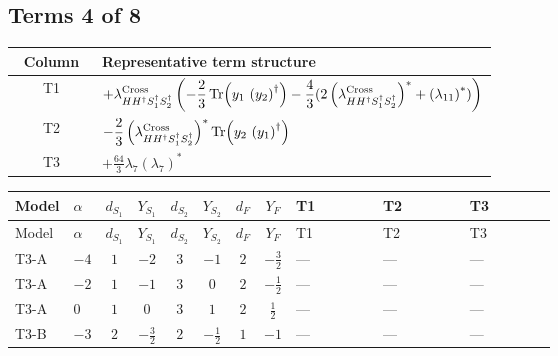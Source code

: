 \documentclass[8pt]{article}
\begin{document}
\begin{landscape}
\subsection*{Terms 4 of 8}
\begin{center}
\begin{tabular}{@{}c >{\raggedright\arraybackslash}p{0.82\linewidth}@{}}
\toprule
Column & Representative term structure \\
\midrule
T1 & \(\displaystyle +{\lambda_{H H^\dagger S_1^\dagger S_2^\dagger}^{\rm Cross}} \left(-\frac{2}{3} \operatorname{Tr}\!\left({y_1}\,\left({y_2}\right)^{\dagger}\right)-\frac{4}{3} (2 \left({\lambda_{H H^\dagger S_1^\dagger S_2^\dagger}^{\rm Cross}}\right)^{*}+\left({\lambda_{11}}\right)^{*})\right)\) \\
\midrule
T2 & \(\displaystyle -\frac{2}{3} \left({\lambda_{H H^\dagger S_1^\dagger S_2^\dagger}^{\rm Cross}}\right)^{*} \operatorname{Tr}\!\left({y_2}\,\left({y_1}\right)^{\dagger}\right)\) \\
\midrule
T3 & \(\displaystyle +\frac{64}{3} {\lambda_{7}} \left({\lambda_{7}}\right)^{*}\) \\
\midrule
\bottomrule
\end{tabular}
\end{center}
\smallskip
\tiny
\begin{longtable}{@{}llcccccc >{\raggedright\arraybackslash}p{0.21\linewidth} >{\raggedright\arraybackslash}p{0.21\linewidth} >{\raggedright\arraybackslash}p{0.21\linewidth}@{}}
\toprule
Model & $\alpha$ & $d_{S_1}$ & $Y_{S_1}$ & $d_{S_2}$ & $Y_{S_2}$ & $d_F$ & $Y_F$ & T1 & T2 & T3 \\
\midrule
\endfirsthead
\toprule
Model & $\alpha$ & $d_{S_1}$ & $Y_{S_1}$ & $d_{S_2}$ & $Y_{S_2}$ & $d_F$ & $Y_F$ & T1 & T2 & T3 \\
\midrule
\endhead
T3-A & $-4$ & $1$ & $-2$ & $3$ & $-1$ & $2$ & $-\frac{3}{2}$ & --- & --- & --- \\
\midrule
T3-A & $-2$ & $1$ & $-1$ & $3$ & $0$ & $2$ & $-\frac{1}{2}$ & --- & --- & --- \\
\midrule
T3-A & $0$ & $1$ & $0$ & $3$ & $1$ & $2$ & $\frac{1}{2}$ & --- & --- & --- \\
\midrule
T3-B & $-3$ & $2$ & $-\frac{3}{2}$ & $2$ & $-\frac{1}{2}$ & $1$ & $-1$ & --- & --- & --- \\
\midrule

\end{longtable}
\end{landscape}
\end{document}
